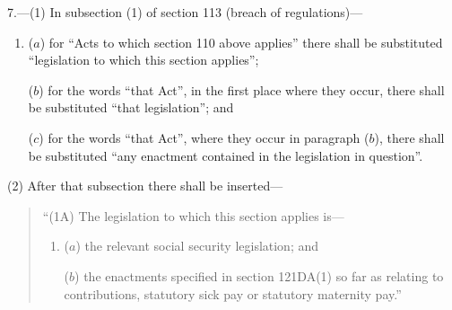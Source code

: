 \documentclass[12pt,a4paper]{article}
\begin{document}
7.---(1) In subsection (1)  of section 113 (breach of regulations)—
\begin{enumerate}\item[]
($a$) for “Acts to which section 110 above applies” there shall be substituted “legislation to which this section applies”;

($b$) for the words “that Act”, in the first place where they occur, there shall be substituted “that legislation”; and

($c$) for the words “that Act”, where they occur in paragraph ($b$), there shall be substituted “any enactment contained in the legislation in question”.
\end{enumerate}

(2) After that subsection there shall be inserted—
\begin{quotation}
“(1A) The legislation to which this section applies is—
\begin{enumerate}\item[]
($a$) the relevant social security legislation; and

($b$) the enactments specified in section 121DA(1)  so far as relating to contributions, statutory sick pay or statutory maternity pay.”
\end{enumerate}
\end{quotation}

\medskip
\end{document}

